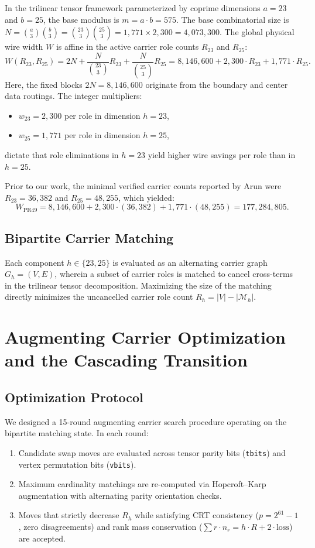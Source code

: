 \documentclass[11pt,a4paper]{article}
\begin{document}
In the trilinear tensor framework parameterized by coprime dimensions $a=23$ and $b=25$, the base modulus is $m = a \cdot b = 575$. The base combinatorial size is $N = \binom{a}{3}\binom{b}{3} = \binom{23}{3}\binom{25}{3} = 1,771 \times 2,300 = 4,073,300$. The global physical wire width $W$ is affine in the active carrier role counts $R_{23}$ and $R_{25}$:
\begin{equation}
W(R_{23}, R_{25}) = 2N + \frac{N}{\binom{23}{3}} R_{23} + \frac{N}{\binom{25}{3}} R_{25} = 8,146,600 + 2,300 \cdot R_{23} + 1,771 \cdot R_{25}.
\end{equation}
Here, the fixed blocks $2N = 8,146,600$ originate from the boundary and center data routings. The integer multipliers:
\begin{itemize}
    \item $w_{23} = 2,300$ per role in dimension $h=23$,
    \item $w_{25} = 1,771$ per role in dimension $h=25$,
\end{itemize}
dictate that role eliminations in $h=23$ yield higher wire savings per role than in $h=25$.

Prior to our work, the minimal verified carrier counts reported by Arun \cite{arun2026} were $R_{23} = 36,382$ and $R_{25} = 48,255$, which yielded:
\[
W_{\text{PR49}} = 8,146,600 + 2,300 \cdot (36,382) + 1,771 \cdot (48,255) = 177,284,805.
\]

\subsection{Bipartite Carrier Matching}
Each component $h \in \{23, 25\}$ is evaluated as an alternating carrier graph $G_h = (V, E)$, wherein a subset of carrier roles is matched to cancel cross-terms in the trilinear tensor decomposition. Maximizing the size of the matching directly minimizes the uncancelled carrier role count $R_h = |V| - |\mathcal{M}_h|$.

\section{Augmenting Carrier Optimization and the Cascading Transition}

\subsection{Optimization Protocol}
We designed a 15-round augmenting carrier search procedure operating on the bipartite matching state. In each round:
\begin{enumerate}
    \item Candidate swap moves are evaluated across tensor parity bits (\texttt{tbits}) and vertex permutation bits (\texttt{vbits}).
    \item Maximum cardinality matchings are re-computed via Hopcroft--Karp augmentation with alternating parity orientation checks.
    \item Moves that strictly decrease $R_h$ while satisfying CRT consistency ($p = 2^{61}-1$, zero disagreements) and rank mass conservation ($\sum r \cdot n_r = h \cdot R + 2 \cdot \text{loss}$) are accepted.
\end{enumerate}
\end{document}
